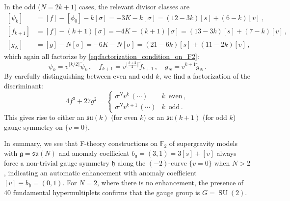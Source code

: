 \documentclass[11pt, a4paper]{article}
\newcommand*{\bbF}{\ensuremath{\mathbb{F}}}
\newcommand*{\fkg}{\ensuremath{\mathfrak{g}}}
\newcommand*{\fkh}{\ensuremath{\mathfrak{h}}}
\DeclareMathOperator{\SU}{SU}
\newcommand*{\fksu}{\ensuremath{\mathfrak{su}}}
\begin{document}
In the odd ($N=2k+1$) cases, the relevant divisor classes are
\begin{equation}
\begin{split}
    [\psi_k] & = [f] - [\phi_0] - k[\sigma] = -3K - k[\sigma] = (12-3k)[s] + (6 - k)[v] \, , \\
    [f_{k+1}] & = [f] - (k+1)[\sigma] = -4K - (k+1)[\sigma] = (13-3k)[s] + (7-k) [v] \, , \\
    [g_N] & = [g] - N[\sigma] = -6K - N[\sigma] = (21 - 6k) [s] + (11 - 2k) [v] \, ,
\end{split}
\end{equation}
which again all factorize by \cref{eq:factorization_condition_on_F2}:
\begin{equation}
    \psi_k = v^{\lceil k/2 \rceil} \tilde{\psi}_k \, , \quad f_{k+1} = v^{\lfloor \frac{k+2}{2} \rfloor} \tilde{f}_{k+1} \, , \quad g_N = v^{k+1} \tilde{g}_N \, .
\end{equation}
By carefully distinguishing between even and odd $k$, we find a factorization of the discriminant:
\begin{equation}
    4f^3 + 27g^2 = \begin{cases}
        \sigma^N v^{k} \, (\dotsb) & k \, \text{ even} \, , \\
        \sigma^N v^{k+1} \, (\dotsb) & k \, \text{ odd} \, .
        \end{cases}
\end{equation}
This gives rise to either an $\fksu(k)$ (for even $k$) or an $\fksu(k+1)$ (for odd $k$) gauge symmetry on $\{v=0\}$.


In summary, we see that F-theory constructions on $\bbF_2$ of supergravity models with $\fkg = \fksu(N)$ and anomaly coefficient $b_\fkg = (3,1) = 3[s]+[v]$ always force a non-trivial gauge symmetry $\fkh$ along the $(-2)$-curve $\{v=0\}$ when $N>2$, indicating an automatic enhancement with anomaly coefficient $[v] \equiv b_\fkh= (0,1)$.
For $N=2$, where there is no enhancement, the presence of 40 fundamental hypermultiplets confirms that the gauge group is $G = \SU(2)$.




\end{document}
